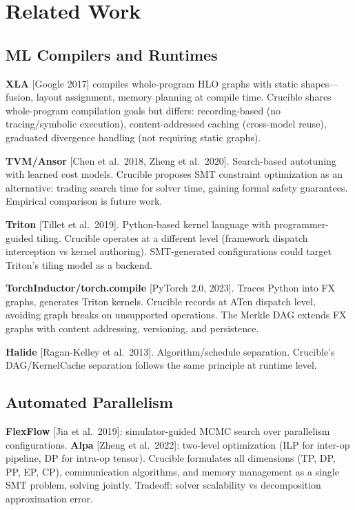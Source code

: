 
\section{Related Work}\label{sec:related}

\subsection{ML Compilers and Runtimes}

\textbf{XLA} [Google 2017] compiles whole-program HLO graphs with static shapes---fusion, layout assignment, memory planning at compile time.
Crucible shares whole-program compilation goals but differs: recording-based (no tracing/symbolic execution), content-addressed caching (cross-model reuse), graduated divergence handling (not requiring static graphs).

\textbf{TVM/Ansor} [Chen et al.\ 2018, Zheng et al.\ 2020].
Search-based autotuning with learned cost models.
Crucible proposes SMT constraint optimization as an alternative: trading search time for solver time, gaining formal safety guarantees.
Empirical comparison is future work.

\textbf{Triton} [Tillet et al.\ 2019].
Python-based kernel language with programmer-guided tiling.
Crucible operates at a different level (framework dispatch interception vs kernel authoring).
SMT-generated configurations could target Triton's tiling model as a backend.

\textbf{TorchInductor/torch.compile} [PyTorch 2.0, 2023].
Traces Python into FX graphs, generates Triton kernels.
Crucible records at ATen dispatch level, avoiding graph breaks on unsupported operations.
The Merkle DAG extends FX graphs with content addressing, versioning, and persistence.

\textbf{Halide} [Ragan-Kelley et al.\ 2013].
Algorithm/schedule separation.
Crucible's DAG/KernelCache separation follows the same principle at runtime level.

\subsection{Automated Parallelism}

\textbf{FlexFlow} [Jia et al.\ 2019]: simulator-guided MCMC search over parallelism configurations.
\textbf{Alpa} [Zheng et al.\ 2022]: two-level optimization (ILP for inter-op pipeline, DP for intra-op tensor).
Crucible formulates all dimensions (TP, DP, PP, EP, CP), communication algorithms, and memory management as a single SMT problem, solving jointly.
Tradeoff: solver scalability vs decomposition approximation error.

